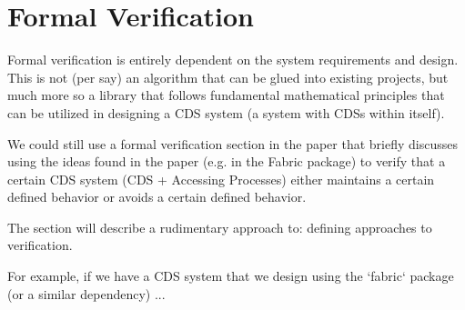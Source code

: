 \section{Formal Verification}

Formal verification is entirely dependent on the system requirements and design. This is not (per say) an algorithm that can be glued into existing projects, but much more so a library that follows fundamental mathematical principles that can be utilized in designing a CDS system (a system with CDSs within itself).

We could still use a formal verification section in the paper that briefly discusses using the ideas found in the paper (e.g. in the Fabric package) to verify that a certain CDS system (CDS + Accessing Processes) either maintains a certain defined behavior or avoids a certain defined behavior.

The section will describe a rudimentary approach to: defining approaches to verification.

For example, if we have a CDS system that we design using the `fabric` package (or a similar dependency) ...
